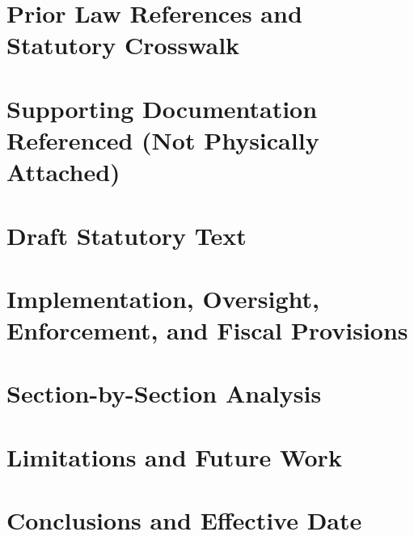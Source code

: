 \documentclass[11pt]{article}
\begin{document}
\section{Prior Law References and Statutory Crosswalk}
\label{sec:prior_law}


\section{Supporting Documentation Referenced (Not Physically Attached)}
\label{sec:supporting_documentation}


\section{Draft Statutory Text}
\label{sec:statutory_text}


\section{Implementation, Oversight, Enforcement, and Fiscal Provisions}
\label{sec:implementation_enforcement}


\section{Section-by-Section Analysis}
\label{sec:section_by_section}


\section{Limitations and Future Work}
\label{sec:limitations}


\section{Conclusions and Effective Date}
\label{sec:conclusions}


\clearpage
{}
{}
\begingroup
\raggedright
\nocite{*}


\endgroup

\clearpage

\end{document}
